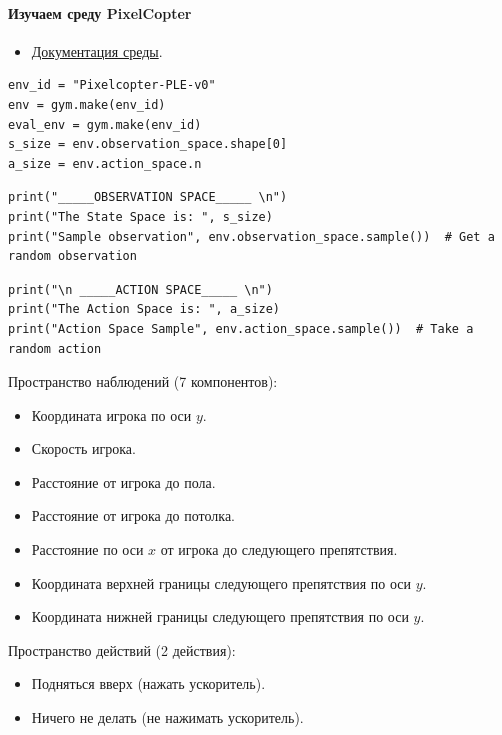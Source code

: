 \documentclass[11pt,a4paper]{article}
\begin{document}
\paragraph{Изучаем среду PixelCopter}\label{study-the-pixelcopter-environment}

\begin{itemize}
\tightlist
\item
  \href{https://pygame-learning-environment.readthedocs.io/en/latest/user/games/pixelcopter.html}{Документация среды}.
\end{itemize}

\begin{lstlisting}
env_id = "Pixelcopter-PLE-v0"
env = gym.make(env_id)
eval_env = gym.make(env_id)
s_size = env.observation_space.shape[0]
a_size = env.action_space.n
\end{lstlisting}

\begin{lstlisting}
print("_____OBSERVATION SPACE_____ \n")
print("The State Space is: ", s_size)
print("Sample observation", env.observation_space.sample())  # Get a random observation
\end{lstlisting}

\begin{lstlisting}
print("\n _____ACTION SPACE_____ \n")
print("The Action Space is: ", a_size)
print("Action Space Sample", env.action_space.sample())  # Take a random action
\end{lstlisting}

Пространство наблюдений (7 компонентов):

\begin{itemize}
\tightlist
\item
  Координата игрока по оси \(y\).
\item
  Скорость игрока.
\item
  Расстояние от игрока до пола.
\item
  Расстояние от игрока до потолка.
\item
  Расстояние по оси \(x\) от игрока до следующего препятствия.
\item
  Координата верхней границы следующего препятствия по оси \(y\).
\item
  Координата нижней границы следующего препятствия по оси \(y\).
\end{itemize}

Пространство действий (2 действия):

\begin{itemize}
\tightlist
\item
  Подняться вверх (нажать ускоритель).
\item
  Ничего не делать (не нажимать ускоритель).
\end{itemize}
\end{document}
